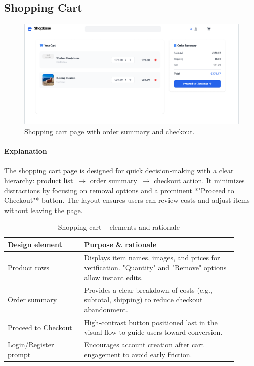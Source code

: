 \documentclass[11pt,a4paper]{article}
\begin{document}

	\subsection{Shopping Cart}\label{subsec:shopping-cart}

	\begin{figure}[H]
		\centering
		\includegraphics[width=\linewidth]{pictures/main/ShoppingCart_Figma}%
		\caption{Shopping cart page with order summary and checkout.}
		\label{fig:ui-cart}
	\end{figure}

	\paragraph{Explanation}%
	The shopping cart page is designed for quick decision-making with a clear hierarchy:
	product list~$\rightarrow$ order summary~$\rightarrow$ checkout action. It minimizes distractions
	by focusing on removal options and a prominent *"Proceed to Checkout"* button.
	The layout ensures users can review costs and adjust items without leaving the page.

	\begin{table}[H]
		\centering
		\caption{Shopping cart – elements and rationale}
		\label{tab:cart-elements}

		\begin{tabular}{p{0.30\linewidth} p{0.60\linewidth}}
        	\toprule
        	\textbf{Design element} & \textbf{Purpose \& rationale} \\ \midrule
				Product rows            & Displays item names, images, and prices for verification. "Quantity" and "Remove" options allow instant edits. \\
        		Order summary           & Provides a clear breakdown of costs (e.g., subtotal, shipping) to reduce checkout abandonment. \\
        		Proceed to Checkout  & High-contrast button positioned last in the visual flow to guide users toward conversion. \\
        		Login/Register prompt   & Encourages account creation after cart engagement to avoid early friction. \\
        	\bottomrule
    	\end{tabular}

	\end{table}
\end{document}
